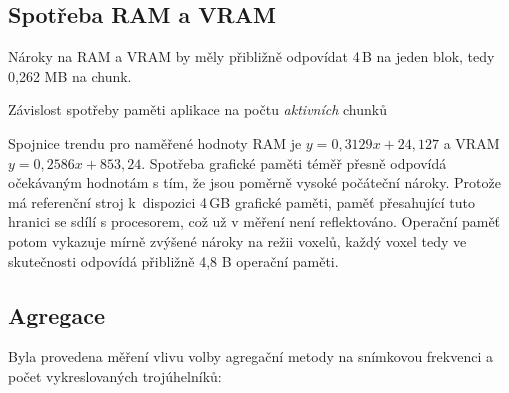 \subsection{Spotřeba RAM a VRAM}
Nároky na RAM a VRAM by měly přibližně odpovídat 4\,B na jeden blok, tedy 0,262 MB na chunk.

\begin{graphFloat}[H]
	\caption{Závislost spotřeby paměti aplikace na počtu \textit{aktivních} chunků}
\end{graphFloat}

Spojnice trendu pro naměřené hodnoty RAM je $y = 0,3129x + 24,127$ a VRAM $y = 0,2586x + 853,24$. Spotřeba grafické paměti téměř přesně odpovídá očekávaným hodnotám s tím, že jsou poměrně vysoké počáteční nároky. Protože má referenční stroj k~dispozici 4\,GB grafické paměti, paměť přesahující tuto hranici se sdílí s procesorem, což už v měření není reflektováno. Operační paměť potom vykazuje mírně zvýšené nároky na režii voxelů, každý voxel tedy ve skutečnosti odpovídá přibližně 4,8 B operační paměti.

\pagebreak
\subsection{Agregace} \label{perf:aggregation}
Byla provedena měření vlivu volby agregační metody na snímkovou frekvenci a počet vykreslovaných trojúhelníků:

